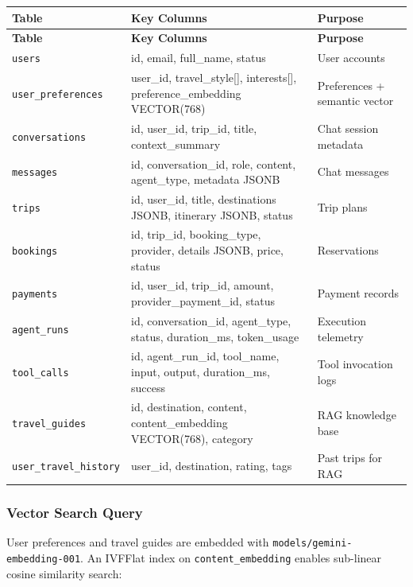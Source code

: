\documentclass[12pt, a4paper]{article}
\begin{document}
\begin{longtable}{|l|p{4.5cm}|p{5.5cm}|}
  \hline
  \textbf{Table} & \textbf{Key Columns} & \textbf{Purpose} \\
  \hline
  \endfirsthead
  \hline
  \textbf{Table} & \textbf{Key Columns} & \textbf{Purpose} \\
  \hline
  \endhead
  \texttt{users} & id, email, full\_name, status & User accounts \\
  \hline
  \texttt{user\_preferences} & user\_id, travel\_style[], interests[], preference\_embedding VECTOR(768) & Preferences + semantic vector \\
  \hline
  \texttt{conversations} & id, user\_id, trip\_id, title, context\_summary & Chat session metadata \\
  \hline
  \texttt{messages} & id, conversation\_id, role, content, agent\_type, metadata JSONB & Chat messages \\
  \hline
  \texttt{trips} & id, user\_id, title, destinations JSONB, itinerary JSONB, status & Trip plans \\
  \hline
  \texttt{bookings} & id, trip\_id, booking\_type, provider, details JSONB, price, status & Reservations \\
  \hline
  \texttt{payments} & id, user\_id, trip\_id, amount, provider\_payment\_id, status & Payment records \\
  \hline
  \texttt{agent\_runs} & id, conversation\_id, agent\_type, status, duration\_ms, token\_usage & Execution telemetry \\
  \hline
  \texttt{tool\_calls} & id, agent\_run\_id, tool\_name, input, output, duration\_ms, success & Tool invocation logs \\
  \hline
  \texttt{travel\_guides} & id, destination, content, content\_embedding VECTOR(768), category & RAG knowledge base \\
  \hline
  \texttt{user\_travel\_history} & user\_id, destination, rating, tags & Past trips for RAG \\
  \hline
\end{longtable}

\subsubsection{Vector Search Query}

User preferences and travel guides are embedded with \texttt{models/gemini-embedding-001}. An IVFFlat index on \texttt{content\_embedding} enables sub-linear cosine similarity search:
\end{document}
